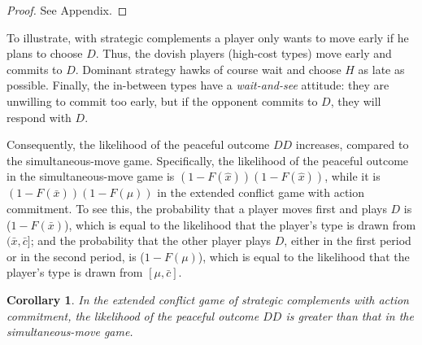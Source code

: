 \documentclass[12pt,english]{article}
\begin{document}
\begin{proof}
See Appendix.
\end{proof}\par
To illustrate, with strategic complements a player only wants to move early if he plans to choose $D$. Thus, the dovish players (high-cost types) move early and commits to $D$. Dominant strategy hawks of course wait and choose $H$ as late as possible. Finally, the in-between types have a \textit{wait-and-see} attitude: they are unwilling to commit too early, but if the opponent commits to $D$, they will respond with $D$. \par 
Consequently, the likelihood of the peaceful outcome $DD$ increases, compared to the simultaneous-move game. Specifically, the likelihood of the peaceful outcome in the simultaneous-move game is $(1-F(\hat{x}))(1-F(\hat{x}))$, while it is $(1-F(\bar{x}))(1-F(\mu))$ in the extended conflict game with action commitment. To see this, the probability that a player moves first and plays $D$ is ($1-F(\bar{x})$), which is equal to the likelihood that the player's type is drawn from $(\bar{x}, \bar{c}]$; and the probability that the other player plays $D$, either in the first period or in the second period, is ($1-F(\mu)$), which is equal to the likelihood that the player's type is drawn from $[\mu, \bar{c}]$.\par
\newtheorem{corol}{Corollary}
\begin{corol}
In the extended conflict game of strategic complements with action commitment, the likelihood of the peaceful outcome $DD$ is greater than that in the simultaneous-move game. 
\end{corol}\par
\end{document}
